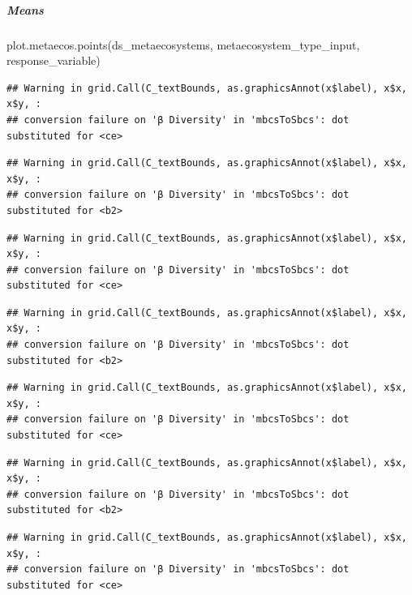 \documentclass[
]{article}
\newenvironment{Shaded}{\begin{snugshade}}{\end{snugshade}}
\newcommand{\FunctionTok}[1]{\textcolor[rgb]{0.00,0.00,0.00}{#1}}
\newcommand{\NormalTok}[1]{#1}
\begin{document}
\hypertarget{means-2}{%
\subparagraph{Means}\label{means-2}}

\begin{Shaded}
\begin{Highlighting}[]
\FunctionTok{plot.metaecos.points}\NormalTok{(ds\_metaecosystems, metaecosystem\_type\_input,}
\NormalTok{                     response\_variable)}
\end{Highlighting}
\end{Shaded}

\begin{verbatim}
## Warning in grid.Call(C_textBounds, as.graphicsAnnot(x$label), x$x, x$y, :
## conversion failure on 'β Diversity' in 'mbcsToSbcs': dot substituted for <ce>
\end{verbatim}

\begin{verbatim}
## Warning in grid.Call(C_textBounds, as.graphicsAnnot(x$label), x$x, x$y, :
## conversion failure on 'β Diversity' in 'mbcsToSbcs': dot substituted for <b2>
\end{verbatim}

\begin{verbatim}
## Warning in grid.Call(C_textBounds, as.graphicsAnnot(x$label), x$x, x$y, :
## conversion failure on 'β Diversity' in 'mbcsToSbcs': dot substituted for <ce>
\end{verbatim}

\begin{verbatim}
## Warning in grid.Call(C_textBounds, as.graphicsAnnot(x$label), x$x, x$y, :
## conversion failure on 'β Diversity' in 'mbcsToSbcs': dot substituted for <b2>
\end{verbatim}

\begin{verbatim}
## Warning in grid.Call(C_textBounds, as.graphicsAnnot(x$label), x$x, x$y, :
## conversion failure on 'β Diversity' in 'mbcsToSbcs': dot substituted for <ce>
\end{verbatim}

\begin{verbatim}
## Warning in grid.Call(C_textBounds, as.graphicsAnnot(x$label), x$x, x$y, :
## conversion failure on 'β Diversity' in 'mbcsToSbcs': dot substituted for <b2>
\end{verbatim}

\begin{verbatim}
## Warning in grid.Call(C_textBounds, as.graphicsAnnot(x$label), x$x, x$y, :
## conversion failure on 'β Diversity' in 'mbcsToSbcs': dot substituted for <ce>
\end{verbatim}
\end{document}
